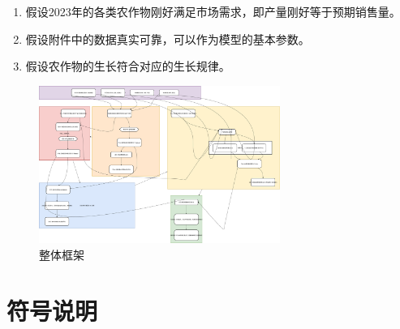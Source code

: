 \documentclass[withoutpreface,bwprint]{cumcmthesis} %
\begin{document}
\begin{enumerate}
	\item 假设2023年的各类农作物刚好满足市场需求，即产量刚好等于预期销售量。
	\item 假设附件中的数据真实可靠，可以作为模型的基本参数。
	\item 假设农作物的生长符合对应的生长规律。
\end{enumerate}


\begin{figure}[htbp]
    \centering
    \includegraphics[width=0.7\textwidth]{figures/all.png}
    \caption{整体框架}
    \label{fig:all}
\end{figure}

\section{符号说明}
\end{document}
